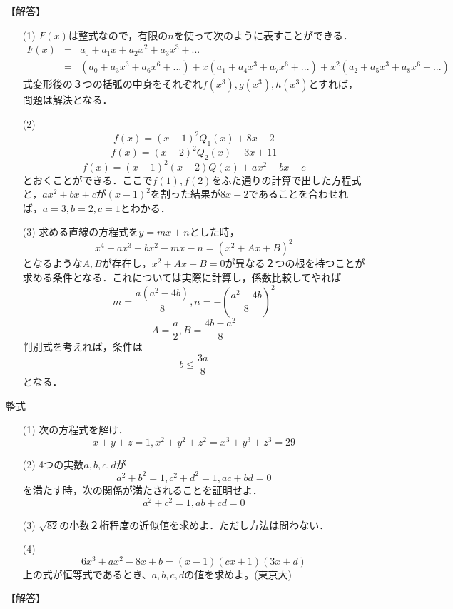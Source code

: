 \documentclass[a4paper,fleqn,dvipdfmx]{jsarticle}
\begin{document}
\begin{flushleft}
【解答】
\end{flushleft}

\begin{itemize}
    \item [(1)] $F(x)$は整式なので，有限の$n$を使って次のように表すことができる．
    \begin{eqnarray}
        F(x)&=&a_0+a_1x+a_2x^2+a_3x^3+...\\ &=&(a_0+a_3x^3+a_6x^6+...)+x(a_1+a_4x^3+a_7x^6+...)+x^2(a_2+a_5x^3+a_8x^6+...)
    \end{eqnarray}
    式変形後の３つの括弧の中身をそれぞれ$f(x^3),g(x^3),h(x^3)$とすれば，問題は解決となる．
    \item [(2)] $$f(x)=(x-1)^2Q_1(x)+8x-2$$
    $$f(x)=(x-2)^2Q_2(x)+3x+11$$
    $$f(x)=(x-1)^2(x-2)Q(x)+ax^2+bx+c$$
    とおくことができる．ここで$f(1),f(2)$をふた通りの計算で出した方程式と，$ax^2+bx+c$が$(x-1)^2$を割った結果が$8x-2$であることを合わせれば，$a=3,b=2,c=1$とわかる．
    \item [(3)] 求める直線の方程式を$y=mx+n$とした時，$$x^4+ax^3+bx^2-mx-n=(x^2+Ax+B)^2$$となるような$A,B$が存在し，$x^2+Ax+B=0$が異なる２つの根を持つことが求める条件となる．これについては実際に計算し，係数比較してやれば
    $$m=\frac{a(a^2-4b)}{8},n=-\left (\frac{a^2-4b}{8}\right )^2$$
    $$A=\frac{a}{2},B=\frac{4b-a^2}{8}$$
    判別式を考えれば，条件は
    $$b\leq \frac{3a}{8}$$
    となる．
\end{itemize}



\newpage
\begin{itembox}[l]{整式}
\begin{itemize}
    \item [(1)] 次の方程式を解け．
    $$x+y+z=1,x^2+y^2+z^2=x^3+y^3+z^3=29$$
    \item [(2)] 4つの実数$a,b,c,d$が
    $$a^2+b^2=1,c^2+d^2=1,ac+bd=0$$
    を満たす時，次の関係が満たされることを証明せよ．
    $$a^2+c^2=1,ab+cd=0$$
    \item [(3)] $\sqrt{82}$の小数２桁程度の近似値を求めよ．ただし方法は問わない．
    \item [(4)] $$6x^3+ax^2-8x+b=(x-1)(cx+1)(3x+d)$$
    上の式が恒等式であるとき、$a,b,c,d$の値を求めよ。(東京大)
\end{itemize}
\end{itembox}

\begin{flushleft}
【解答】
\end{flushleft}
\end{document}

